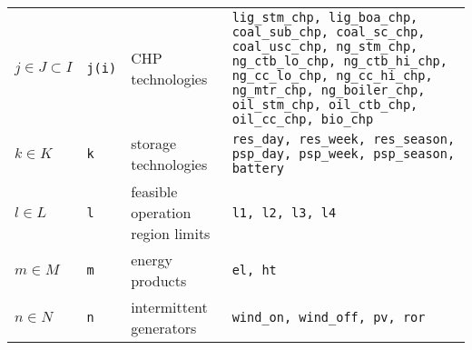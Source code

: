 \documentclass[review, 3p, times, 12pt, authoryear]{elsarticle}
\begin{document}
\begin{longtable}{p{}p{}p{}p{}}
        $j \in J \subset I$ & \texttt{j(i)}      & CHP technologies                 & \texttt{lig\_stm\_chp, lig\_boa\_chp, coal\_sub\_chp, coal\_sc\_chp, coal\_usc\_chp, ng\_stm\_chp, ng\_ctb\_lo\_chp, ng\_ctb\_hi\_chp, ng\_cc\_lo\_chp, ng\_cc\_hi\_chp, ng\_mtr\_chp, ng\_boiler\_chp, oil\_stm\_chp, oil\_ctb\_chp, oil\_cc\_chp, bio\_chp}                                                                                                                                                                                           \\
        $k \in K$           & \texttt{k}         & storage technologies             & \texttt{res\_day, res\_week, res\_season, psp\_day, psp\_week, psp\_season, battery}                                                                                                                                                                                                                                                                                                                                                                    \\
        $l \in L$           & \texttt{l}         & feasible operation region limits & \texttt{l1, l2, l3, l4}                                                                                                                                                                                                                                                                                                                                                                                                                                 \\
        $m \in M$           & \texttt{m}         & energy products                  & \texttt{el, ht}                                                                                                                                                                                                                                                                                                                                                                                                                                         \\
        $n \in N$           & \texttt{n}         & intermittent generators          & \texttt{wind\_on, wind\_off, pv, ror}                                                                                                                                                                                                                                                                                                                                                                                                                   \\

\end{longtable}
\end{document}
